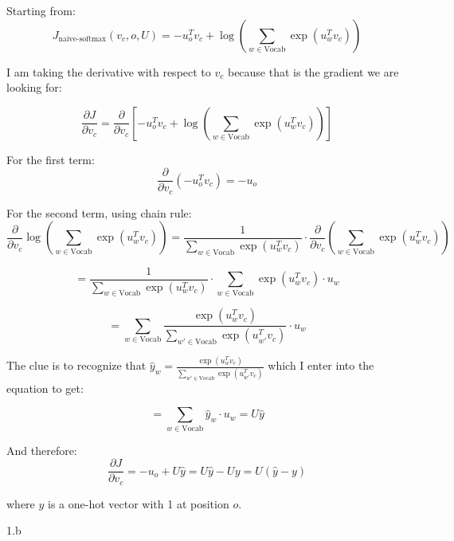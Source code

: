     \begin{answer}
        Starting from:
        $$J_{\text{naive-softmax}}(v_c, o, U) = -u_o^T v_c + \log\left(\sum_{w \in \text{Vocab}} \exp(u_w^T v_c)\right)$$

        I am taking the derivative with respect to $v_c$ because that is the gradient we are looking for:

        $$\frac{\partial J}{\partial v_c} = \frac{\partial}{\partial v_c}\left[-u_o^T v_c + \log\left(\sum_{w \in \text{Vocab}} \exp(u_w^T v_c)\right)\right]$$

        For the first term:
        $$\frac{\partial}{\partial v_c}(-u_o^T v_c) = -u_o$$

        For the second term, using chain rule:
        $$\frac{\partial}{\partial v_c}\log\left(\sum_{w \in \text{Vocab}} \exp(u_w^T v_c)\right) = \frac{1}{\sum_{w \in \text{Vocab}} \exp(u_w^T v_c)} \cdot \frac{\partial}{\partial v_c}\left(\sum_{w \in \text{Vocab}} \exp(u_w^T v_c)\right)$$

        $$= \frac{1}{\sum_{w \in \text{Vocab}} \exp(u_w^T v_c)} \cdot \sum_{w \in \text{Vocab}} \exp(u_w^T v_c) \cdot u_w$$

        $$= \sum_{w \in \text{Vocab}} \frac{\exp(u_w^T v_c)}{\sum_{w' \in \text{Vocab}} \exp(u_{w'}^T v_c)} \cdot u_w$$

        The clue is to recognize that $\hat{y}_w = \frac{\exp(u_w^T v_c)}{\sum_{w' \in \text{Vocab}} \exp(u_{w'}^T v_c)}$ which I enter into the equation to get:

        $$= \sum_{w \in \text{Vocab}} \hat{y}_w \cdot u_w = U\hat{y}$$

        And therefore:
        $$\frac{\partial J}{\partial v_c} = -u_o + U\hat{y} = U\hat{y} - Uy = U(\hat{y} - y)$$

        where $y$ is a one-hot vector with 1 at position $o$.
    \end{answer}
    \clearpage

    \LARGE
    1.b
    \normalsize

